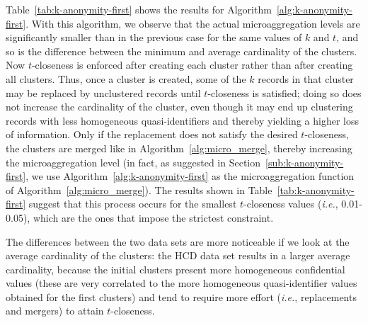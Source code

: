 \documentclass[10pt,journal,compsoc]{IEEEtran}
\theoremstyle{definition}
\theoremstyle{plain}
\begin{document}
Table~\ref{tab:k-anonymity-first} shows the results for Algorithm~\ref{alg:k-anonymity-first}.
With this algorithm, we observe that the actual microaggregation levels are significantly smaller
than in the previous case for the same values of $k$ and $t$, and so is the difference
between the minimum and average cardinality of the clusters. 
Now $t$-closeness is enforced after creating 
each cluster rather than after creating all clusters. Thus, once a cluster is created, 
some of the $k$ records in that cluster may be replaced
by unclustered records until $t$-closeness is satisfied; doing so 
does not increase the cardinality of the cluster, even though it 
may end up clustering records 
with less homogeneous quasi-identifiers and thereby yielding 
a higher loss of information. Only 
if the replacement does not satisfy the desired $t$-closeness, the clusters 
are merged
like in Algorithm~\ref{alg:micro_merge}, 
thereby increasing the microaggregation level
(in fact, as suggested in Section~\ref{sub:k-anonymity-first}, we use 
Algorithm~\ref{alg:k-anonymity-first} as the microaggregation
function of Algorithm~\ref{alg:micro_merge}). 
The results shown in Table~\ref{tab:k-anonymity-first}
suggest that this process occurs for the smallest $t$-closeness values
({\em i.e.}, 0.01-0.05), which are the ones that impose the strictest constraint. 

The differences between the two data sets are more noticeable if we look at the
average cardinality of the clusters: the HCD data set results in a larger average cardinality,
because the initial clusters present more homogeneous 
confidential values (these are very correlated to the more homogeneous
quasi-identifier values obtained for the first clusters) 
and tend to require more effort ({\em i.e.}, replacements and mergers) 
to attain $t$-closeness. 
\end{document}
